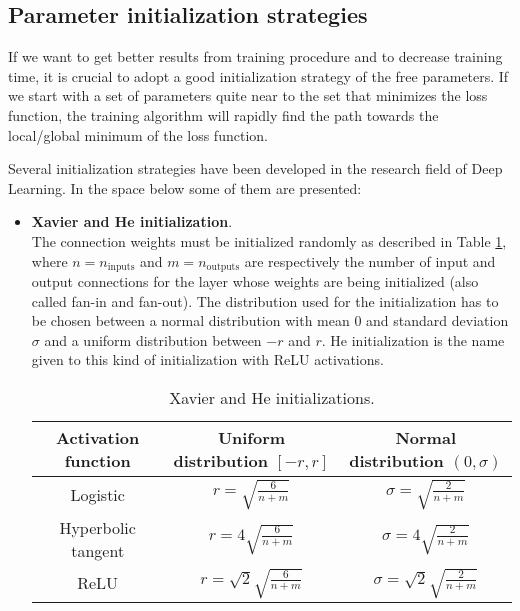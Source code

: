 \subsection{Parameter initialization strategies}
If we want to get better results from training procedure and to decrease training time, it is crucial to adopt a good initialization strategy of the free parameters. If we start with a set of parameters quite near to the set that minimizes the loss function, the training algorithm will rapidly find the path towards the local/global minimum of the loss function.

Several initialization strategies have been developed in the research field of Deep Learning. In the space below some of them are presented:

\begin{itemize}
    \item \textbf{Xavier and He initialization}. \\
    The connection weights must be initialized randomly as described in Table \ref{tab:XAVIER_HE_INITIALIZATIONS}, where $n=n_\text{inputs}$ and $m=n_\text{outputs}$ are respectively the number of input and output connections for the layer whose weights are being initialized (also called fan-in and fan-out). The distribution used for the initialization has to be chosen between a normal distribution with mean 0 and standard deviation $\sigma$ and a uniform distribution between $-r$ and $r$. He initialization is the name given to this kind of initialization with ReLU activations.
    
    \begin{table}[h]
        \centering
        \begin{tabular}{c c c}
            \toprule
             Activation function    &   Uniform distribution $[-r,r]$   &   Normal distribution $(0,\sigma)$   \\
             \toprule
             Logistic   &
             $ \displaystyle
                 r = \sqrt{\frac{6}{n+m}}
             $    &
             $ \displaystyle
                 \sigma = \sqrt{\frac{2}{n+m}}
             $ \\
             Hyperbolic tangent   &
             $ \displaystyle
                 r = 4 \sqrt{\frac{6}{n+m}}
             $    &
             $ \displaystyle
                 \sigma = 4 \sqrt{\frac{2}{n+m}}
             $ \\
             ReLU   &
             $ \displaystyle
                 r = \sqrt{2} \sqrt{\frac{6}{n+m}}
             $    &
             $ \displaystyle
                 \sigma = \sqrt{2} \sqrt{\frac{2}{n+m}}
             $ \\
             \bottomrule
        \end{tabular}
        \caption{Xavier and He initializations.}
        \label{tab:XAVIER_HE_INITIALIZATIONS}
    \end{table}
\end{itemize}
